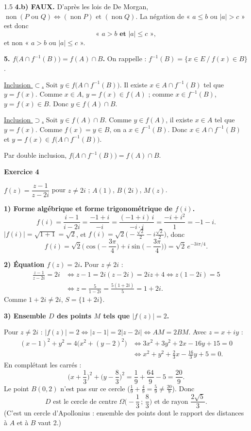 \documentclass[12pt]{article}
\begin{document}
\begin{spacing}{1.5}
\textbf{4.b) FAUX.} D'après les lois de De Morgan, $\operatorname{non}(P\text{ ou }Q)\iff(\operatorname{non}P)\text{ et }(\operatorname{non}Q)$. La négation de « $a\le b$ ou $|a|>c$ » est donc
\[
\text{« } a>b \textbf{ et } |a|\le c \text{ »},
\]
et non « $a>b$ ou $|a|\le c$ ».

\textbf{5. $f\big(A\cap f^{-1}(B)\big)=f(A)\cap B$.} On rappelle : $f^{-1}(B)=\{x\in E\ /\ f(x)\in B\}$.

\underline{Inclusion $\subset$.} Soit $y\in f\big(A\cap f^{-1}(B)\big)$. Il existe $x\in A\cap f^{-1}(B)$ tel que $y=f(x)$. Comme $x\in A$, $y=f(x)\in f(A)$ ; comme $x\in f^{-1}(B)$, $y=f(x)\in B$. Donc $y\in f(A)\cap B$.

\underline{Inclusion $\supset$.} Soit $y\in f(A)\cap B$. Comme $y\in f(A)$, il existe $x\in A$ tel que $y=f(x)$. Comme $f(x)=y\in B$, on a $x\in f^{-1}(B)$. Donc $x\in A\cap f^{-1}(B)$ et $y=f(x)\in f\big(A\cap f^{-1}(B)\big)$.

Par double inclusion, $f\big(A\cap f^{-1}(B)\big)=f(A)\cap B$.

\medskip\textbf{Exercice 4}

$f(z)=\dfrac{z-1}{z-2i}$ pour $z\neq2i$ ; $A(1)$, $B(2i)$, $M(z)$.

\textbf{1) Forme algébrique et forme trigonométrique de $f(i)$.}
\[
f(i)=\frac{i-1}{i-2i}=\frac{-1+i}{-i}=\frac{(-1+i)\,i}{-i\cdot i}=\frac{-i+i^2}{1}=\boxed{-1-i}.
\]
$|f(i)|=\sqrt{1+1}=\sqrt2$, et $f(i)=\sqrt2\Big(-\frac{\sqrt2}{2}-i\frac{\sqrt2}{2}\Big)$, donc
\[
\boxed{f(i)=\sqrt2\Big(\cos\Big(-\frac{3\pi}{4}\Big)+i\sin\Big(-\frac{3\pi}{4}\Big)\Big)=\sqrt2\,e^{-3i\pi/4}}.
\]

\textbf{2) Équation $f(z)=2i$.} Pour $z\neq2i$ :
\begin{align*}
\frac{z-1}{z-2i}=2i&\iff z-1=2i(z-2i)=2iz+4\iff z(1-2i)=5\\
&\iff z=\frac{5}{1-2i}=\frac{5(1+2i)}{5}=1+2i .
\end{align*}
Comme $1+2i\neq2i$, $\boxed{S=\{1+2i\}}$.

\textbf{3) Ensemble $D$ des points $M$ tels que $|f(z)|=2$.}

Pour $z\neq2i$ : $|f(z)|=2\iff|z-1|=2|z-2i|\iff AM=2BM$. Avec $z=x+iy$ :
\begin{align*}
(x-1)^2+y^2=4\big(x^2+(y-2)^2\big)&\iff3x^2+3y^2+2x-16y+15=0\\
&\iff x^2+y^2+\frac23x-\frac{16}{3}y+5=0 .
\end{align*}
En complétant les carrés :
\[
\Big(x+\frac13\Big)^2+\Big(y-\frac83\Big)^2=\frac19+\frac{64}9-5=\frac{20}{9}.
\]
Le point $B(0,2)$ n'est pas sur ce cercle ($\frac19+\frac49=\frac59\neq\frac{20}9$). Donc
\[
\boxed{D \text{ est le cercle de centre } \Omega\Big(-\frac13\,;\,\frac83\Big) \text{ et de rayon } \frac{2\sqrt5}{3}}.
\]
(C'est un cercle d'Apollonius : ensemble des points dont le rapport des distances à $A$ et à $B$ vaut 2.)

\end{spacing}
\end{document}

